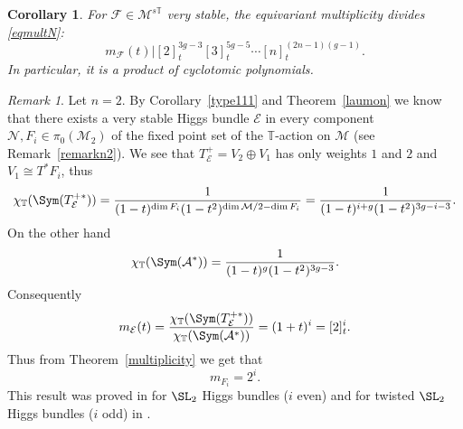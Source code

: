 \documentclass[12pt]{article}
\numberwithin{equation}{section}
\newtheorem{corollary}[theorem]{Corollary}
\theoremstyle{remark}
\newtheorem{remark}[theorem]{Remark}
\theoremstyle{definition}
\numberwithin{theorem}{section}
\def\calE{{\mathcal E}}
\def\calN{{\mathcal{N}}}
\def\M{{\mathcal{M}}}
\def\calA{{\mathcal{A}}}
\def\calF{{\mathcal{F}}}
\newcommand{\T}{{\mathbb{T}}}
\renewcommand{\1}{\mathbbm{1}}
\begin{document}
\begin{corollary}  For $\calF\in \M^{s\T}$  very stable, the equivariant multiplicity divides \eqref{eqmultN}:
	$$m_\calF(t)|[2]_t^{3g-3}[3]_t^{5g-5}\cdots [{n}]_t^{(2n-1)(g-1)}.$$  In particular, it is a product of cyclotomic polynomials. 
\end{corollary}

\begin{remark}\label{rank2} Let $n=2$. By Corollary~\ref{type111} and Theorem~\ref{laumon} we know that there exists a very stable Higgs bundle $\calE$ in every component $\calN,F_i\in \pi_0(\M_2)$ of the fixed point set of the $\T$-action on $\M$ (see Remark~\ref{remarkn2}).  We see that $T^+_\calE=V_2\oplus V_1$ has only weights $1$ and $2$ and $V_1\cong T^*F_i$, thus $$\chi_\T(\Sym(T^{+*}_\calE))={1\over (1-t)^{\dim F_i}(1-t^2)^{\dim \M/2-\dim F_i}}={1\over(1-t)^{i+g}(1-t^2)^{3g-i-3}}.$$ On the other hand $$\chi_\T(\Sym(\calA^*))={1\over(1-t)^g(1-t^2)^{3g-3}}.$$ Consequently $$m_{\calE}(t)={{ \chi_\T(\Sym(T^{+*}_\calE))\over \chi_\T(\Sym(\calA^*))}}=(1+t)^{i}=[2]_t^i.$$  Thus from Theorem~\ref{multiplicity} we get that $$m_{F_i}=2^i.$$ This result was proved in \cite[Proposition 6]{hitchin1} for $\SL_2$ Higgs bundles ($i$ even) and for twisted $\SL_2$ Higgs bundles ($i$ odd) in \cite{hausel-thaddeus}.	\end{remark}
\end{document}
